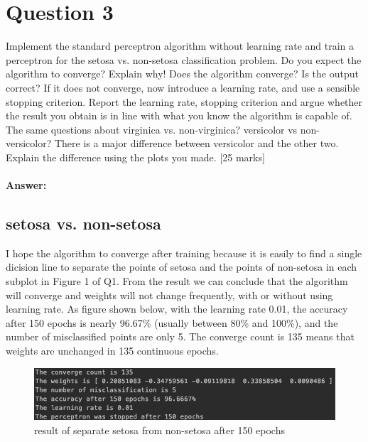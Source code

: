\documentclass{article}
\begin{document}
\section{Question 3}
Implement the standard perceptron algorithm without learning rate and train a perceptron for the setosa vs. non-setosa classification problem. Do you expect the algorithm to converge? Explain why! Does the algorithm converge? Is the output correct? If it does not converge, now introduce a learning rate, and use a sensible stopping criterion. Report the learning rate, stopping criterion and argue whether the result you obtain is in line with what you know the algorithm is capable of. The same questions about virginica vs. non-virginica? versicolor vs non-versicolor? There is a major difference between versicolor and the other two. Explain the difference using the plots you made.
[25 marks]\\\\
\textbf{Answer:}
\subsection{setosa vs. non-setosa}
I hope the algorithm to converge after training because it is easily to find a single dicision line to separate the points of setosa and the points of non-setosa in each subplot in Figure 1 of Q1. From the result we can conclude that the algorithm will converge and weights will not change frequently, with or without using learning rate. As figure shown below, with the learning rate 0.01, the accuracy after 150 epochs is nearly 96.67\% (usually between 80\% and 100\%), and the number of misclassified points are only 5. The converge count is 135 means that weights are unchanged in 135 continuous epochs.
\begin{figure}[H]
\centering
\includegraphics[scale=0.4]{console.png}
\caption{result of separate setosa from non-setosa after 150 epochs}
\end{figure}
\noindent
\end{document}
